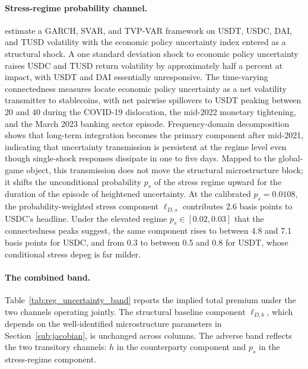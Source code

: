 \paragraph{Stress-regime probability channel.} \citet{alasadi_bewaji_gugnani_gupta_heijmans_2025} estimate a GARCH, SVAR, and TVP-VAR framework on USDT, USDC, DAI, and TUSD volatility with the \citet{baker_bloom_davis_2016} economic policy uncertainty index entered as a structural shock. A one standard deviation shock to economic policy uncertainty raises USDC and TUSD return volatility by approximately half a percent at impact, with USDT and DAI essentially unresponsive. The time-varying connectedness measures locate economic policy uncertainty as a net volatility transmitter to stablecoins, with net pairwise spillovers to USDT peaking between 20 and 40 during the COVID-19 dislocation, the mid-2022 monetary tightening, and the March 2023 banking sector episode. Frequency-domain decomposition shows that long-term integration becomes the primary component after mid-2021, indicating that uncertainty transmission is persistent at the regime level even though single-shock responses dissipate in one to five days. Mapped to the global-game object, this transmission does not move the structural microstructure block; it shifts the unconditional probability $p_s$ of the stress regime upward for the duration of the episode of heightened uncertainty. At the calibrated $p_s = 0.0108$, the probability-weighted stress component $\ell_{D,s}$ contributes 2.6 basis points to USDC's headline. Under the elevated regime $p_s \in [0.02, 0.03]$ that the connectedness peaks suggest, the same component rises to between 4.8 and 7.1 basis points for USDC, and from 0.3 to between 0.5 and 0.8 for USDT, whose conditional stress depeg is far milder.

\paragraph{The combined band.} Table~\ref{tab:reg_uncertainty_band} reports the implied total premium under the two channels operating jointly. The structural baseline component $\ell_{D,b}$, which depends on the well-identified microstructure parameters in Section~\ref{sub:jacobian}, is unchanged across columns. The adverse band reflects the two transitory channels: $h$ in the counterparty component and $p_s$ in the stress-regime component.

